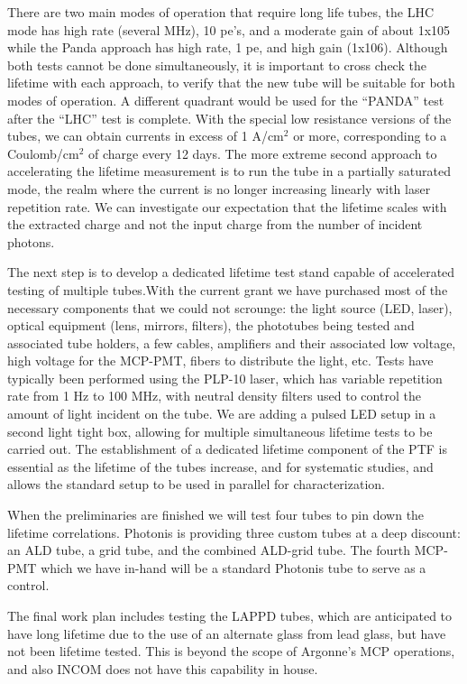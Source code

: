 There are two main modes of operation that require long life tubes, the LHC mode has high rate (several MHz), 10 pe’s, and a moderate gain of about 1x105  while the Panda approach has high rate, 1 pe, and high gain (1x106). Although both tests cannot be done simultaneously, it is important to cross check the lifetime with each approach, to verify that the new tube will be suitable for both modes of operation. A different quadrant would be used for the “PANDA” test after the “LHC” test is complete.   With the special low resistance versions of the tubes, we can obtain currents in excess of 1 A/cm$^{2}$ or more, corresponding to a Coulomb/cm$^{2}$ of charge every 12 days. The more extreme second approach to accelerating the lifetime measurement is to run the tube in a partially saturated mode, the realm where the current is no longer increasing linearly with laser repetition rate. We can investigate our expectation that the lifetime scales with the extracted charge and not the input charge from the number of incident photons. 

The next step is to develop a dedicated lifetime test stand capable of accelerated testing of multiple tubes.With the current grant we have purchased most of the necessary components that we could not scrounge: the light source (LED, laser), optical equipment (lens, mirrors, filters), the phototubes being tested and associated tube holders, a few cables, amplifiers and their associated low voltage, high voltage for the MCP-PMT, fibers to distribute the light, etc. Tests have typically been  performed using  the PLP-10 laser, which has variable repetition rate from 1 Hz to 100 MHz, with neutral density filters used to control the amount of light incident on the tube.  We are adding a pulsed LED setup in a second light tight box, allowing for multiple simultaneous lifetime tests to be carried out.  The establishment of a dedicated lifetime component of the PTF is essential as the lifetime of the tubes increase, and for systematic studies, and allows the standard setup to be used in parallel for characterization.

When the preliminaries are finished we will test four tubes to pin down the lifetime correlations. Photonis is providing three custom tubes at a deep discount: an ALD tube, a grid tube, and the combined ALD-grid tube. The fourth MCP-PMT which we have in-hand will be a standard Photonis tube to serve as a control.
 
The final work plan includes testing the LAPPD tubes, which are anticipated to have long lifetime due to the use of an alternate glass from lead glass, but have not been lifetime tested. This is beyond the scope of Argonne’s MCP operations, and also INCOM does not have this capability in house. 

